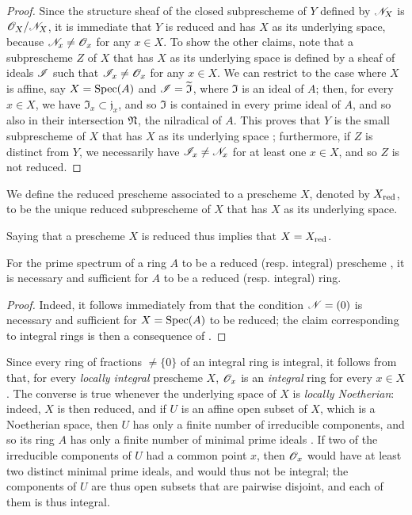 \begin{proof}
Since the structure sheaf of the closed subprescheme of $Y$ defined by $\mathscr{N}_X$ is $\mathscr{O}_X/\mathscr{N}_X$, it is immediate that $Y$ is reduced and has $X$ as its underlying space, because $\mathscr{N}_x\neq\mathscr{O}_x$ for any $x\in X$.
To show the other claims, note that a subprescheme $Z$ of $X$ that has $X$ as its underlying space is defined by a sheaf of ideals $\mathscr{I}$  such that $\mathscr{I}_x\neq\mathscr{O}_x$ for any $x\in X$.
We can restrict to the case where $X$ is affine, say $X=\operatorname{Spec}(A)$ and $\mathscr{I}=\widetilde{\mathfrak{I}}$, where $\mathfrak{I}$ is an ideal of $A$;
then, for every $x\in X$, we have $\mathfrak{I}_x\subset\mathfrak{j}_x$, and so $\mathfrak{I}$ is contained in every prime ideal of $A$, and so also in their intersection $\mathfrak{N}$, the nilradical of $A$.
This proves that $Y$ is the small subprescheme of $X$ that has $X$ as its underlying space ;
furthermore, if $Z$ is distinct from $Y$, we necessarily have $\mathscr{I}_x\neq\mathscr{N}_x$ for at least one $x\in X$, and so  $Z$ is not reduced.
\end{proof}

\begin{definition}[5.1.3]
\label{I.5.1.3}
We define the reduced prescheme associated to a prescheme $X$, denoted by $X_{\mathrm{red}}$, to be the unique reduced subprescheme of $X$ that has $X$ as its underlying space.
\end{definition}

Saying that a prescheme $X$ is reduced thus implies that $X=X_{\mathrm{red}}$.

\begin{proposition}[5.1.4]
\label{I.5.1.4}
For the prime spectrum of a ring $A$ to be a reduced (resp. integral) prescheme , it is necessary and sufficient for $A$ to be a reduced (resp. integral) ring.
\end{proposition}

\begin{proof}
Indeed, it follows immediately from  that the condition $\mathscr{N}=(0)$ is necessary and sufficient for $X=\operatorname{Spec}(A)$ to be reduced;
the claim corresponding to integral rings is then a consequence of .
\end{proof}

Since every ring of fractions $\neq\{0\}$ of an integral ring is integral, it follows from  that, for every \emph{locally integral} prescheme $X$, $\mathscr{O}_x$ is an \emph{integral} ring for every $x\in X$.
The converse is true whenever the underlying space of $X$ is \emph{locally Noetherian}:
indeed, $X$ is then reduced, and if $U$ is an affine open subset of $X$, which is a Noetherian space, then $U$ has only a finite number of irreducible components, and so its ring $A$ has only a finite number of minimal prime ideals .
If two of the irreducible components of $U$ had a common point $x$, then $\mathscr{O}_x$ would have at least two distinct minimal prime ideals, and would thus not be integral;
the components of $U$ are thus open subsets that are pairwise disjoint, and each of them is thus integral.

